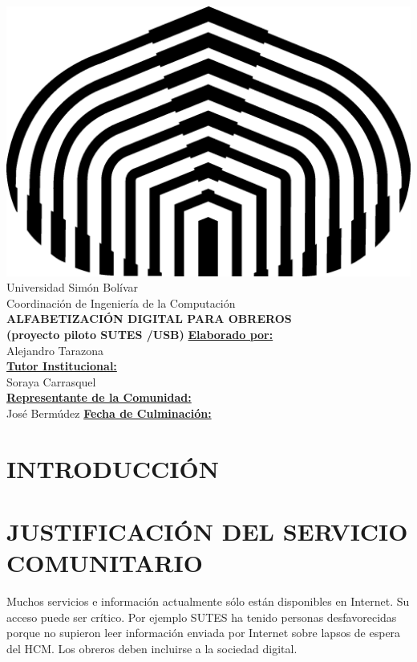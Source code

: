 \documentclass[letterpaper,12pt]{article}
\begin{document}
	
	\begin{center}
		\includegraphics{./img/logo.png} \\
		Universidad Simón Bolívar \\
		Coordinación de Ingeniería de la Computación \\ 
		\vfill
		{\LARGE \textbf{ALFABETIZACIÓN DIGITAL PARA OBREROS \\ (proyecto piloto SUTES /USB)} }
		\vfill
		\underline{\textbf{Elaborado por:}}\\
		Alejandro Tarazona \\
		\underline{\textbf{Tutor Institucional:}}\\
		Soraya Carrasquel \\
		\underline{\textbf{Representante de la Comunidad:}}\\
		José Bermúdez
		\linebreak
        \linebreak
		\underline{\textbf{Fecha de Culminación:}}\\
		
	\end{center}
	\pagebreak
    
	\tableofcontents
	\pagebreak
	
	\section{INTRODUCCIÓN}
	\pagebreak
	
	\section{JUSTIFICACIÓN DEL SERVICIO COMUNITARIO}
		Muchos servicios e información actualmente sólo están disponibles en Internet. Su acceso puede ser crítico. Por ejemplo SUTES ha tenido personas desfavorecidas porque no supieron leer información enviada por Internet sobre lapsos de espera del HCM. Los obreros deben incluirse a la sociedad digital.
        
\end{document}
